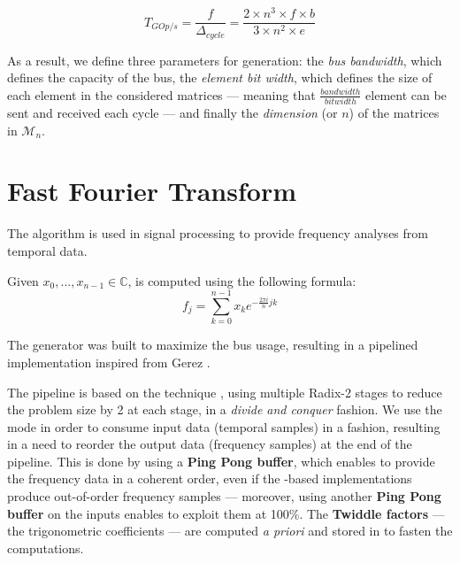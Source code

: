         \begin{equation}
            \label{app.benchmark:sec.gemm:eq.throughput}
            T_{GOp/s} = \frac{f}{\Delta_{cycle}} = \frac{2 \times n^3 \times f \times b}{3 \times n^2 \times e}
        \end{equation}

        As a result, we define three parameters for  generation: the {\it bus bandwidth}, which defines the capacity of the  bus, the {\it element bit width}, which defines the size of each element in the considered matrices --- meaning that $\frac{bandwidth}{bitwidth}$ element can be sent and received each cycle --- and finally the {\it dimension} (or $n$) of the matrices in $\mathcal{M}_n$.

    \clearpage
    \section*{Fast Fourier Transform}
        The  algorithm is used in signal processing to provide frequency analyses from temporal data.

        Given $x_0, ..., x_{n-1} \in \mathbb{C}$,  is computed using the following formula:
        \begin{equation}
            \label{app.benchmark:sec.fft:eq.formula}
            f_j = \sum_{k=0}^{n-1}x_k e^{-\frac{2\pi i}{n}jk}
        \end{equation}

        The  generator was built to maximize the  bus usage, resulting in a pipelined implementation inspired from Gerez \cite{gerez_fft_2012}.

        The pipeline is based on the  technique \cite{rabiner1975theory}, using multiple Radix-2 stages to reduce the  problem size by 2 at each stage, in a {\it divide and conquer} fashion.
        We use the  mode in order to consume input data (temporal samples) in a  fashion, resulting in a need to reorder the output data (frequency samples) at the end of the pipeline.
        This is done by using a {\bf Ping Pong buffer}, which enables to provide the frequency data in a coherent order, even if the -based implementations produce out-of-order frequency samples --- moreover, using another {\bf Ping Pong buffer} on the  inputs enables to exploit them at 100\%.
        The {\bf Twiddle factors} --- \ie the trigonometric coefficients --- are computed {\it a priori} and stored in  to fasten the computations.

